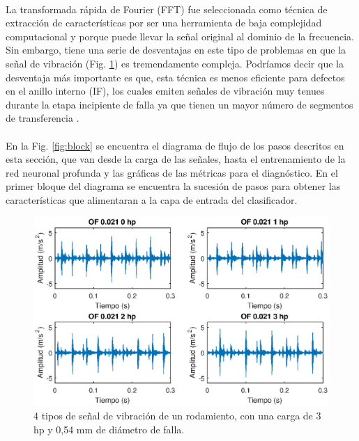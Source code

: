 \documentclass[12pt]{article}%
\begin{document}
\paragraph{}
La transformada rápida de Fourier (FFT) fue seleccionada como técnica de extracción de características por ser una herramienta de baja complejidad computacional y porque puede llevar la señal original al dominio de la frecuencia. Sin embargo, tiene una serie de desventajas en este tipo de problemas en que la señal de vibración (Fig. \ref{fig:senales}) es tremendamente compleja. Podríamos decir que la desventaja más importante es que, esta técnica es menos eficiente para defectos en el anillo interno (IF), los cuales emiten señales de vibración muy tenues durante la etapa incipiente de falla ya que tienen un mayor número de segmentos de transferencia \cite{rai}. 

\paragraph{}
En la Fig. \ref{fig:block} se encuentra el diagrama de flujo de los pasos descritos en esta sección, que van desde la carga de las señales, hasta el entrenamiento de la red neuronal profunda y las gráficas de las métricas para el diagnóstico. En el primer bloque del diagrama se encuentra la sucesión de pasos para obtener las características que alimentaran a la capa de entrada del clasificador.

\begin{figure}[ht]
  \centering
    \includegraphics[scale=0.9]{./signalOF.eps}
  \caption{4 tipos de señal de vibración de un rodamiento, con una carga de 3 hp y 0,54 mm de diámetro de falla.}
  \label{fig:senales}
\end{figure}
\end{document}
